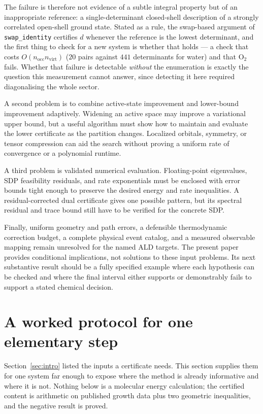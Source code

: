 \documentclass[11pt,a4paper]{article}
\theoremstyle{plain}
\theoremstyle{definition}
\theoremstyle{remark}
\providecommand{\path}[1]{\texttt{#1}}
\begin{document}
The failure is therefore not evidence of a subtle integral property but of an
inappropriate reference: a single-determinant closed-shell description of a
strongly correlated open-shell ground state. Stated as a rule, the swap-based
argument of \path{swap_identity} certifies $d$ whenever the reference is the
lowest determinant, and the first thing to check for a new system is whether that
holds --- a check that costs $O(n_{\mathrm{occ}}n_{\mathrm{virt}})$
($20$ pairs against $441$ determinants for water) and that O$_2$ fails. Whether
that failure is detectable \emph{without} the enumeration is exactly the question
this measurement cannot answer, since detecting it here required diagonalising the
whole sector.

A second problem is to combine active-state improvement and lower-bound
improvement adaptively. Widening an active space may improve a variational
upper bound, but a useful algorithm must show how to maintain and evaluate
the lower certificate as the partition changes. Localized orbitals, symmetry,
or tensor compression can aid the search without proving a uniform rate of
convergence or a polynomial runtime.

A third problem is validated numerical evaluation. Floating-point eigenvalues,
SDP feasibility residuals, and rate exponentials must be enclosed with error
bounds tight enough to preserve the desired energy and rate inequalities.
A residual-corrected dual certificate gives one possible
pattern, but its spectral residual and trace bound still have to be verified
for the concrete SDP.

Finally, uniform geometry and path errors, a defensible thermodynamic
correction budget, a complete physical event catalog, and a measured
observable mapping remain unresolved for the named ALD targets. The present
paper provides conditional implications, not solutions to these input
problems. Its next substantive result should be a fully specified example
where each hypothesis can be checked and where the final interval either
supports or demonstrably fails to support a stated chemical decision.

\section{A worked protocol for one elementary step}
\label{sec:worked}

Section~\ref{sec:intro} listed the inputs a certificate needs. This section
supplies them for one system far enough to expose where the method is already
informative and where it is not. Nothing below is a molecular energy
calculation; the certified content is arithmetic on published growth data plus
two geometric inequalities, and the negative result is proved.
\end{document}
